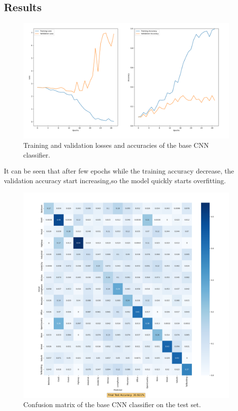\documentclass[12pt, a4paper, italian]{scrartcl}
\begin{document}
 \subsection{Results}
 \begin{figure} [h!]
 \centering
  { \includegraphics[width=.85\textwidth]{fig/loss_and_accuracy_task_1.png} \caption{Training and validation losses and accuracies of the base CNN classifier.
}} 
  \end{figure}
  It can be seen that after few epochs while the training accuracy decrease, the validation accuracy start increasing,so the model quickly starts overfitting.
 \newpage
 
  \begin{figure} [h!]
 \centering
  { \includegraphics[width=.85\textwidth]{fig/confusion_matrix_task_1.png} \caption{Confusion matrix of the base CNN classifier on the test set.
}} 
  \end{figure}
  
\end{document}
